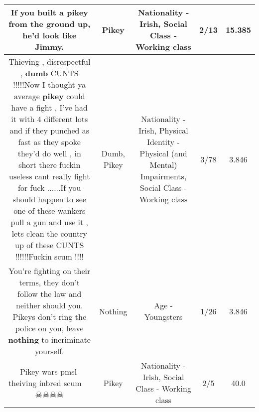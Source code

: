 \documentclass[11pt]{article}
\newlength\mylength
\begin{document}
\begin{center}
\begin{longtable}{|C{.65\mylength}|C{.30\mylength}|C{.12\mylength}|C{.12\mylength}|C{.12\mylength}|}
  \small If you built a \textbf{p\textbf{ikey}} from the ground up, he'd look like Jimmy.\normalsize   & Pikey & Nationality - Irish, Social Class - Working class & 2/13 & 15.385 \\  \hline
  \small Thieving , disrespectful , \textbf{dumb} CUNTS !!!!!Now I thought ya average \textbf{p\textbf{ikey}} could have a fight , I've had it with 4 different lots and if they punched as fast as they spoke they'd do well , in short there fuckin useless cant really fight for fuck ......If you should happen to see one of these wankers pull a gun and use it , lets clean the country up of these CUNTS !!!!!!Fuckin scum !!!!\normalsize   & Dumb, Pikey & Nationality - Irish, Physical Identity - Physical (and Mental) Impairments, Social Class - Working class & 3/78 & 3.846 \\  \hline
  \small You're fighting on their terms, they don't follow the law and neither should you. Pikeys don't ring the police on you, leave \textbf{nothing} to incriminate yourself.\normalsize   & Nothing & Age - Youngsters & 1/26 & 3.846 \\  \hline
  \small Pikey wars pmsl🤣theiving inbred scum🤢🤢🤮😷☠☠☠☠\normalsize   & Pikey & Nationality - Irish, Social Class - Working class & 2/5 & 40.0 \\  \hline

\end{longtable}
\end{center}
\end{document}
